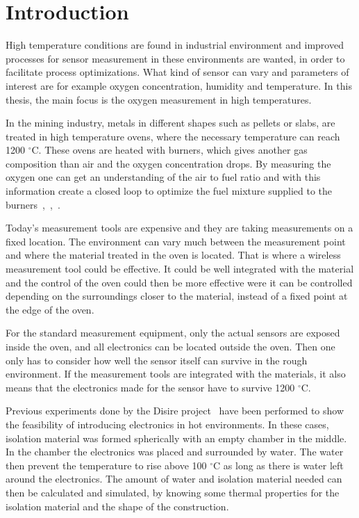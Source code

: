 %
%


\section{Introduction}

High temperature conditions are found in industrial environment and improved processes for sensor measurement in these environments are wanted, in order to facilitate process optimizations. What kind of sensor can vary and parameters of interest are for example oxygen concentration, humidity and temperature. In this thesis, the main focus is the oxygen measurement in high temperatures.

In the mining industry, metals in different shapes such as pellets or slabs, are treated in high temperature ovens, where the necessary temperature can reach 1200 $^\circ$C. These ovens are heated with burners, which gives another gas composition than air and the oxygen concentration drops. By measuring the oxygen one can get an understanding of the air to fuel ratio and with this information create a closed loop to optimize the fuel mixture supplied to the burners~\cite{Nicolas},~\cite{Richards},~\cite{USdepartment}.

Today's measurement tools are expensive and they are taking measurements on a fixed location. The environment can vary much between the measurement point and where the material treated in the oven is located. That is where a wireless measurement tool could be effective. It could be well integrated with the material and the control of the oven could then be more effective were it can be controlled depending on the surroundings closer to the material, instead of a fixed point at the edge of the oven.

For the standard measurement equipment, only the actual sensors are exposed inside the oven, and all electronics can be located outside the oven. Then one only has to consider how well the sensor itself can survive in the rough environment. If the measurement tools are integrated with the materials, it also means that the electronics made for the sensor have to survive 1200 $^\circ$C. 

Previous experiments done by the Disire project~\cite{DISIRE2} have been performed to show the feasibility of introducing electronics in hot environments. In these cases, isolation material was formed spherically with an empty chamber in the middle. In the chamber the electronics was placed and surrounded by water. The water then prevent the temperature to rise above 100 $^\circ$C as long as there is water left around the electronics. The amount of water and isolation material needed can then be calculated and simulated, by knowing some thermal properties for the isolation material and the shape of the construction. 

